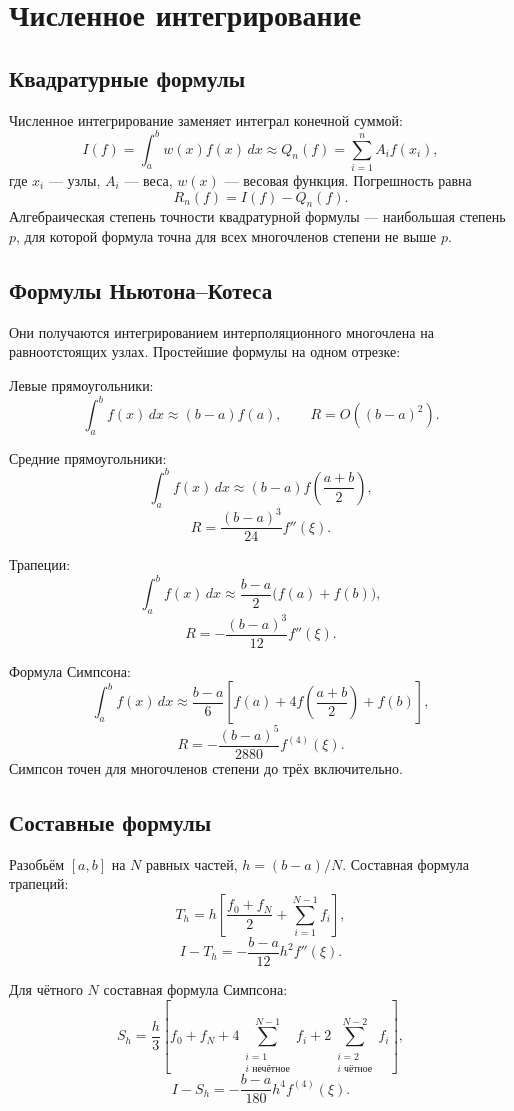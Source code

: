 \section{Численное интегрирование}
\label{sec:numerical-integration}

\subsection{Квадратурные формулы}

Численное интегрирование заменяет интеграл конечной суммой:
\[
    I(f)=\int_a^b w(x)f(x)\,dx
    \approx
    Q_n(f)=\sum_{i=1}^{n}A_i f(x_i),
\]
где $x_i$ --- узлы, $A_i$ --- веса, $w(x)$ --- весовая функция.
Погрешность равна
\[
    R_n(f)=I(f)-Q_n(f).
\]
Алгебраическая степень точности квадратурной формулы --- наибольшая степень
$p$, для которой формула точна для всех многочленов степени не выше $p$.

\subsection{Формулы Ньютона--Котеса}

Они получаются интегрированием интерполяционного многочлена на равноотстоящих
узлах. Простейшие формулы на одном отрезке:

Левые прямоугольники:
\[
    \int_a^b f(x)\,dx
    \approx (b-a)f(a),
    \qquad R=O((b-a)^2).
\]

Средние прямоугольники:
\[
    \int_a^b f(x)\,dx
    \approx (b-a)f\left(\frac{a+b}{2}\right),
\]
\[
    R=\frac{(b-a)^3}{24}f''(\xi).
\]

Трапеции:
\[
    \int_a^b f(x)\,dx
    \approx \frac{b-a}{2}\bigl(f(a)+f(b)\bigr),
\]
\[
    R=-\frac{(b-a)^3}{12}f''(\xi).
\]

Формула Симпсона:
\[
    \int_a^b f(x)\,dx
    \approx
    \frac{b-a}{6}
    \left[f(a)+4f\left(\frac{a+b}{2}\right)+f(b)\right],
\]
\[
    R=-\frac{(b-a)^5}{2880}f^{(4)}(\xi).
\]
Симпсон точен для многочленов степени до трёх включительно.

\subsection{Составные формулы}

Разобьём $[a,b]$ на $N$ равных частей, $h=(b-a)/N$.
Составная формула трапеций:
\[
    T_h=h\left[
    \frac{f_0+f_N}{2}+\sum_{i=1}^{N-1}f_i
    \right],
\]
\[
    I-T_h=-\frac{b-a}{12}h^2f''(\xi).
\]

Для чётного $N$ составная формула Симпсона:
\[
S_h=\frac{h}{3}
\left[
 f_0+f_N
 +4\sum_{\substack{i=1\\i\text{ нечётное}}}^{N-1}f_i
 +2\sum_{\substack{i=2\\i\text{ чётное}}}^{N-2}f_i
\right],
\]
\[
    I-S_h=-\frac{b-a}{180}h^4f^{(4)}(\xi).
\]

